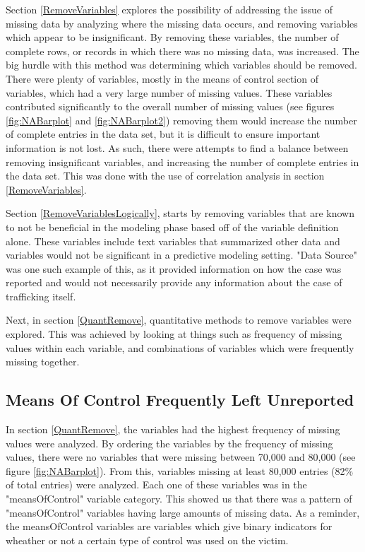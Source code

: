 \documentclass{article} %
\begin{document}
	Section \ref{RemoveVariables} explores the possibility of addressing the issue of missing data by analyzing where the missing data occurs, and removing variables which appear to be insignificant. By removing these variables, the number of complete rows, or records in which there was no missing data, was increased. The big hurdle with this method was determining which variables should be removed. There were plenty of variables, mostly in the means of control section of variables, which had a very large number of missing values. These variables contributed significantly to the overall number of missing values (see figures \ref{fig:NABarplot} and \ref{fig:NABarplot2}) removing them would increase the number of complete entries in the data set, but it is difficult to ensure important information is not lost. As such, there were attempts to find a balance between removing insignificant variables, and increasing the number of complete entries in the data set. This was done with the use of correlation analysis in section \ref{RemoveVariables}.
	
	Section \ref{RemoveVariablesLogically}, starts by removing variables that are known to not be beneficial in the modeling phase based off of the variable definition alone. These variables include text variables that summarized other data and variables would not be significant in a predictive modeling setting. "Data Source" was one such example of this, as it provided information on how the case was reported and would not necessarily provide any information about the case of trafficking itself.
	
	Next, in section \ref{QuantRemove}, quantitative methods to remove variables were explored. This was achieved by looking at things such as frequency of missing values within each variable, and combinations of variables which were frequently missing together.
	
	\subsection{Means Of Control Frequently Left Unreported}
	
	 In section \ref{QuantRemove}, the variables had the highest frequency of missing values were analyzed. By ordering the variables by the frequency of missing values, there were no variables that were missing between 70,000 and 80,000 (see figure \ref{fig:NABarplot}). From this, variables missing at least 80,000 entries (82\% of total entries) were analyzed. Each one of these variables was in the "meansOfControl" variable category. This showed us that there was a pattern of "meansOfControl" variables having large amounts of missing data. As a reminder, the meansOfControl variables are variables which give binary indicators for wheather or not a certain type of control was used on the victim.
	
\end{document}

